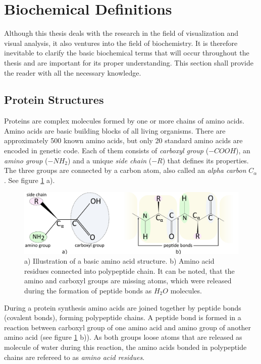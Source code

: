\section{Biochemical Definitions}
\label{Sec:Chem}
Although this thesis deals with the research in the field of visualization and visual analysis, it also ventures into the field of biochemistry. It is therefore inevitable to clarify the basic biochemical terms that will occur throughout the thesis and are important for its proper understanding. This section shall provide the reader with all the necessary knowledge.

\subsection{Protein Structures}
\label{Sec:structures}
Proteins are complex molecules formed by one or more chains of amino acids. Amino acids are basic building blocks of all living organisms. There are approximately 500 known amino acids, but only 20 standard amino acids are encoded in genetic code. Each of them consists of \textit{carboxyl group} ($-COOH$), an \textit{amino group} ($-NH_2$) and a unique \textit{side chain} ($-R$) that defines its properties. The three groups are connected by a carbon atom, also called an \textit{alpha carbon} $C_\alpha$. See figure \ref{Fig:aa} a).

\begin{figure}[H]
  \centering
  \includegraphics[width=\textwidth]{pictures/aminoacid.pdf} 
  \caption{a) Illustration of a basic amino acid structure. b) Amino acid residues connected into polypeptide chain. It can be noted, that the amino and carboxyl groups are missing atoms, which were released during the formation of peptide bonds as $H_2O$ molecules.}
  \label{Fig:aa}
\end{figure}

During a protein synthesis amino acids are joined together by peptide bonds (covalent bonds), forming polypeptide chains. A peptide bond is formed in a reaction between carboxyl group of one amino acid and amino group of another amino acid (see figure \ref{Fig:aa} b)). As both groups loose atoms that are released as molecule of water during this reaction, the amino acids bonded in polypeptide chains are refereed to as \textit{amino acid residues}. 

